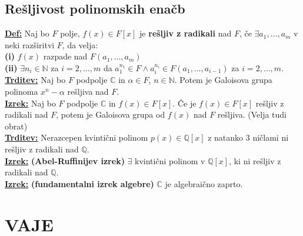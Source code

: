 \documentclass[a4paper,oneside,8pt,landscape]{extarticle}
\let\oldtextbf\textbf
\renewcommand{\textbf}[1]{\oldtextbf{\boldmath #1}}
\newcommand{\definicija}[1]{\textbf{\underline{Def:} }{#1}\\}
\newcommand{\trditev}[1]{\textbf{\underline{Trditev:} }{#1}\\}
\newcommand{\izrek}[1]{\textbf{\underline{Izrek:} }{#1}\\}
\newcommand{\bt}[1]{\textbf{#1}}
\begin{document}
\begin{multicols*}{3}
\subsection*{Rešljivost polinomskih enačb}
\definicija{Naj bo $F$ polje, $f(x)\in F[x]$ je \bt{rešljiv z radikali} nad $F$, če $\exists a_1,\dots,a_m$ v neki razširitvi $F$, da velja: \\
\bt{(i)} $f(x)$ razpade nad $F(a_1,\dots,a_m)$ \\
\bt{(ii)} $\exists n_i\in \mathbb{N}$ za $i=2,\dots,m$ da $a_1^{n_1}\in F \land a_i^{n_i}\in F(a_1,\dots,a_{i-1})$ za $i=2,\dots,m$.}
\trditev{Naj bo $F$ podpolje $\mathbb{C}$ in $\alpha\in F$, $n\in\mathbb{N}$. Potem je Galoisova grupa polinoma $x^n-\alpha$ rešljiva nad $F$.}
\izrek{Naj bo $F$ podpolje $\mathbb{C}$ in $f(x)\in F[x]$. Če je $f(x)\in F[x]$ rešljiv z radikali nad $F$, potem je Galoisova grupa od $f(x)$ nad $F$ rešljiva. (Velja tudi obrat)}
\trditev{Nerazcepen kvintični polinom $p(x)\in\mathbb{Q}[x]$ z natanko 3 ničlami ni rešljiv z radikali nad $\mathbb{Q}$.}
\izrek{\bt{(Abel-Ruffinijev izrek)} $\exists$ kvintični polinom v $\mathbb{Q}[x]$, ki ni rešljiv z radikali nad $\mathbb{Q}$.}
\izrek{\bt{(fundamentalni izrek algebre)} $\mathbb{C}$ je algebraično zaprto.}
\vspace{-15pt}
\section*{VAJE}

\end{multicols*}
\end{document}
